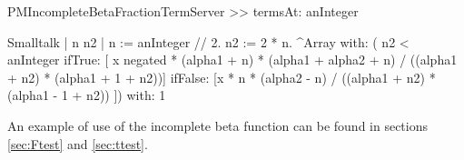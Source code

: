 PMIncompleteBetaFractionTermServer >> termsAt: anInteger
\begin{displaycode}{Smalltalk}
    | n n2 |
    n := anInteger // 2.
    n2 := 2 * n.
    ^Array with: ( n2 < anInteger 
        ifTrue: [ x negated * (alpha1 + n) * (alpha1 + alpha2 + n) 
                                / ((alpha1 + n2) * (alpha1 + 1 + n2))]
        ifFalse: [x * n * (alpha2 - n) / ((alpha1 + n2) * (alpha1 - 1 + n2)) ])
            with: 1
\end{displaycode}

An example of use of the incomplete beta function can be found in
sections \ref{sec:Ftest} and \ref{sec:ttest}.


